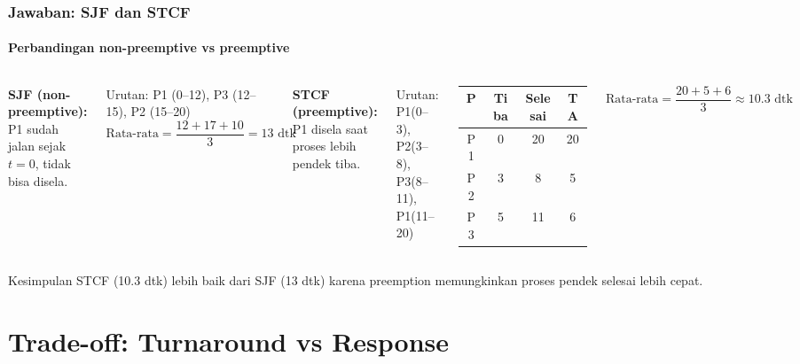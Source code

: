 \documentclass[t,aspectratio=169,xcolor=dvipsnames]{beamer}
\begin{document}
\begin{frame}
    \frametitle{Jawaban: SJF dan STCF}
    \framesubtitle{Perbandingan non-preemptive vs preemptive}
    \footnotesize
    \begin{columns}[T]
        \textbf{SJF (non-preemptive):}\\
        P1 sudah jalan sejak $t=0$, tidak bisa disela.

        \vspace{0.1cm}
        Urutan: P1 (0--12), P3 (12--15), P2 (15--20)
        $$\text{Rata-rata} = \frac{12+17+10}{3} = 13 \text{ dtk}$$

        \textbf{STCF (preemptive):}\\
        P1 disela saat proses lebih pendek tiba.

        \vspace{0.1cm}
        Urutan: P1(0--3), P2(3--8), P3(8--11), P1(11--20)
        \vspace{0.05cm}
        \begin{tabular}{|c|c|c|c|}
            \hline
            \textbf{P} & \textbf{Tiba} & \textbf{Selesai} & \textbf{TA} \\
            \hline
            P1 & 0 & 20 & 20 \\
            \hline
            P2 & 3 & 8 & 5 \\
            \hline
            P3 & 5 & 11 & 6 \\
            \hline
        \end{tabular}
        $$\text{Rata-rata} = \frac{20+5+6}{3} \approx 10.3 \text{ dtk}$$
    \end{columns}
    \begin{block}{Kesimpulan}
        STCF (10.3 dtk) lebih baik dari SJF (13 dtk) karena preemption memungkinkan proses pendek selesai lebih cepat.
    \end{block}
\end{frame}

\section{Trade-off: Turnaround vs Response}
\end{document}
